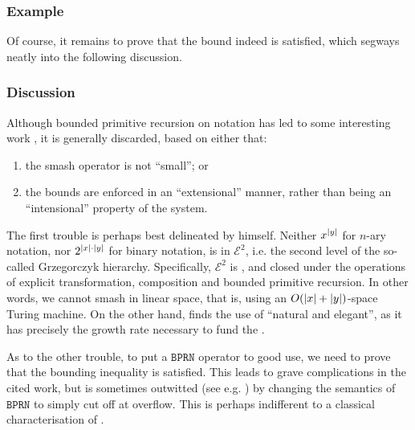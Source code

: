 \subsubsection{Example}

Of course, it remains to prove that the bound indeed is satisfied, which
segways neatly into the following discussion.

\subsubsection{Discussion}

Although bounded primitive recursion on notation has led to some interesting
work \cite{cook-1975, buss-phd-1985-6, cook-urquhart-1993}, it is generally
discarded\cite{bellantoni-cook-1992}, based on either that:

\begin{enumerate}[label=(\arabic*)]

\item the smash operator is not ``small''; or

\item the bounds are enforced in an ``extensional'' manner, rather than being
an ``intensional'' property of the system.

\end{enumerate}

The first trouble is perhaps best delineated by \cite{cobham-1965} himself.
Neither $x^{\mathopen{}\left|{y}\right|\mathclose{}}$ for $n$-ary notation, nor $2^{{\mathopen{}\left|{x}\right|\mathclose{}} \cdot {\ensuremath{\mathopen{}\left|{y}\right|\mathclose{}}}}$
for binary notation, is in $\mathcal{E}^2$, i.e. the second level of the
so-called Grzegorczyk hierarchy\cite{grzegorczyk-1953}. Specifically,
$\mathcal{E}^2$ is , and closed under the operations of explicit
transformation, composition and bounded primitive recursion. In other words, we
cannot smash in linear space, that is, using an $O{\mathopen{}\left({{\mathopen{}\left|{x}\right|\mathclose{}}+{\mathopen{}\left|{y}\right|\mathclose{}}}\right)\mathclose{}}$-space
Turing machine\cite{ritchie-1963}. On the other hand, \cite{buss-phd-1985-6}
finds the use of \smashf{} ``natural and elegant'', as it has precisely the
growth rate necessary to fund the .

As to the other trouble, to put a $\mathtt{BPRN}$ operator to good use, we need
to prove that the bounding inequality is satisfied.  This leads to grave
complications in the cited work, but is sometimes outwitted (see e.g.
\cite{cook-urquhart-1993}) by changing the semantics of $\mathtt{BPRN}$ to
simply cut off at overflow. This is perhaps indifferent to a classical
characterisation of \FPTIME{}.

